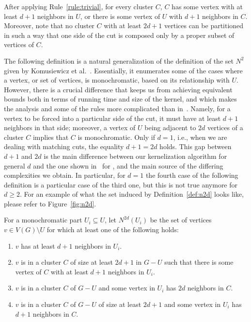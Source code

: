 After applying Rule~\ref{rule:trivial}, for every cluster $C$, $C$  has some vertex with at least $d+1$ neighbors in $U$, or there is some vertex of $U$ with $d+1$ neighbors in $C$.
Moreover, note that no cluster $C$ with at least $2d+1$ vertices can be partitioned in such a way that one side of the cut is composed only by a proper subset of vertices of $C$.

The following definition is a natural generalization of the definition of the set $N^2$ given by Komusiewicz et al.~\cite{matching_cut_ipec}.
Essentially, it enumerates some of the cases where a vertex, or set of vertices, is monochromatic, based on its relationship with $U$.
However, there is a crucial difference that keeps us from achieving equivalent bounds both in terms of running time and size of the kernel, and which makes the analysis and some of the rules more complicated than in~\cite{matching_cut_ipec}.
Namely, for a vertex to be forced into a particular side of the cut, it must have at least $d+1$ neighbors in that side; moreover, a vertex of $U$ being adjacent to $2d$ vertices of a cluster $C$ implies that $C$ is monochromatic.
Only if $d=1$, i.e., when we are dealing with matching cuts, the equality $d+1 = 2d$ holds.
This gap between $d+1$ and $2d$ is the main difference between our kernelization algorithm for general $d$ and the one shown in~\cite{matching_cut_ipec} for , and the main source of the differing complexities we obtain. In particular, for $d=1$ the fourth case of the following definition is a particular case of the third one, but this is not true anymore for $d \geq 2$.
For an example of what the set induced by Definition~\ref{def:n2d} looks like, please refer to Figure~\ref{fig:n2d}.

\begin{definition}
    \label{def:n2d}
    For a monochromatic part $U_i \subseteq U$, let $N^{2d}(U_i)$ be the set of vertices $v \in V(G) \setminus U$ for which at least one of the following holds:

    \begin{enumerate}
        \item $v$ has at least $d+1$ neighbors in $U_i$.
        \item $v$ is in a cluster $C$ of size at least $2d+1$ in $G - U$ such that there is some vertex of $C$ with at least $d+1$ neighbors in $U_i$.
        \item $v$ is in a cluster $C$ of $G - U$ and some vertex in $U_i$ has $2d$ neighbors in $C$.
        \item $v$ is in a cluster $C$ of $G - U$ of size at least $2d+1$ and some vertex in $U_i$ has $d+1$ neighbors in $C$.
    \end{enumerate}
\end{definition}

